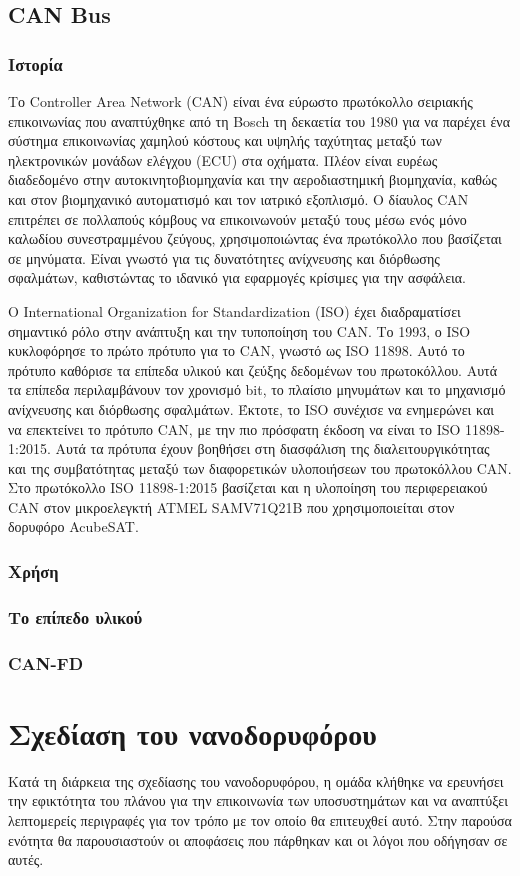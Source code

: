 \documentclass[a4paper,nobib,justified]{tufte-book}
\begin{document}
\section{CAN Bus}
\label{canbus}
\subsection{Ιστορία}
Το Controller Area Network (CAN) είναι ένα εύρωστο πρωτόκολλο σειριακής επικοινωνίας που αναπτύχθηκε από τη Bosch τη δεκαετία του 1980 για να παρέχει ένα σύστημα επικοινωνίας χαμηλού κόστους και υψηλής ταχύτητας μεταξύ των ηλεκτρονικών μονάδων ελέγχου (ECU) στα οχήματα. Πλέον είναι ευρέως διαδεδομένο στην αυτοκινητοβιομηχανία και την αεροδιαστημική βιομηχανία, καθώς και στον βιομηχανικό αυτοματισμό και τον ιατρικό εξοπλισμό. Ο δίαυλος CAN επιτρέπει σε πολλαπούς κόμβους να επικοινωνούν μεταξύ τους μέσω ενός μόνο καλωδίου συνεστραμμένου ζεύγους, χρησιμοποιώντας ένα πρωτόκολλο που βασίζεται σε μηνύματα. Είναι γνωστό για τις δυνατότητες ανίχνευσης και διόρθωσης σφαλμάτων, καθιστώντας το ιδανικό για εφαρμογές κρίσιμες για την ασφάλεια.

Ο International Organization for Standardization (ISO) έχει διαδραματίσει σημαντικό ρόλο στην ανάπτυξη και την τυποποίηση του CAN. Το 1993, ο ISO κυκλοφόρησε το πρώτο πρότυπο για το CAN, γνωστό ως ISO 11898. Αυτό το πρότυπο καθόρισε τα επίπεδα υλικού και ζεύξης δεδομένων του πρωτοκόλλου. Αυτά τα επίπεδα περιλαμβάνουν τον χρονισμό bit, το πλαίσιο μηνυμάτων και το μηχανισμό ανίχνευσης και διόρθωσης σφαλμάτων. Έκτοτε, το ISO συνέχισε να ενημερώνει και να επεκτείνει το πρότυπο CAN, με την πιο πρόσφατη έκδοση να είναι το ISO 11898-1:2015. Αυτά τα πρότυπα έχουν βοηθήσει στη διασφάλιση της διαλειτουργικότητας και της συμβατότητας μεταξύ των διαφορετικών υλοποιήσεων του πρωτοκόλλου CAN. Στο πρωτόκολλο ISO 11898-1:2015 βασίζεται και η υλοποίηση του περιφερειακού CAN στον μικροελεγκτή ATMEL SAMV71Q21B που χρησιμοποιείται στον δορυφόρο AcubeSAT.
\subsection{Χρήση}
\subsection{Το επίπεδο υλικού}
\subsection{CAN-FD}

\chapter{Σχεδίαση του νανοδορυφόρου}
\label{design-choices}
Κατά τη διάρκεια της σχεδίασης του νανοδορυφόρου, η ομάδα κλήθηκε να ερευνήσει την εφικτότητα του πλάνου για την επικοινωνία των υποσυστημάτων και να αναπτύξει λεπτομερείς περιγραφές για τον τρόπο με τον οποίο θα επιτευχθεί αυτό. Στην παρούσα ενότητα θα παρουσιαστούν οι αποφάσεις που πάρθηκαν και οι λόγοι που οδήγησαν σε αυτές.
\end{document}
